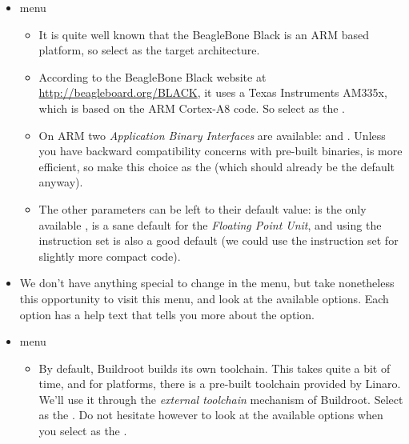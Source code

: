 \begin{itemize}

\item {} menu

  \begin{itemize}

  \item It is quite well known that the BeagleBone Black is an ARM based
    platform, so select  as the target
    architecture.

  \item According to the BeagleBone Black website at
    \url{http://beagleboard.org/BLACK}, it uses a Texas Instruments
    AM335x, which is based on the ARM Cortex-A8 code. So select
     as the .

  \item On ARM two {\em Application Binary Interfaces} are available:
     and . Unless you have backward
    compatibility concerns with pre-built binaries,  is
    more efficient, so make this choice as the 
    (which should already be the default anyway).

  \item The other parameters can be left to their default value:
     is the only available ,
     is a sane default for the {\em Floating Point
      Unit}, and using the  instruction set is also a good
    default (we could use the  instruction set for
    slightly more compact code).

  \end{itemize}

\item We don't have anything special to change in the
   menu, but take nonetheless this opportunity to
  visit this menu, and look at the available options. Each option has
  a help text that tells you more about the option.

\item {} menu

  \begin{itemize}

  \item By default, Buildroot builds its own toolchain. This takes
    quite a bit of time, and for  platforms, there is a
    pre-built toolchain provided by Linaro. We'll use it through the
    {\em external toolchain} mechanism of Buildroot. Select
     as the . Do not
    hesitate however to look at the available options when you select
     as the .


\end{itemize}
\end{itemize}
